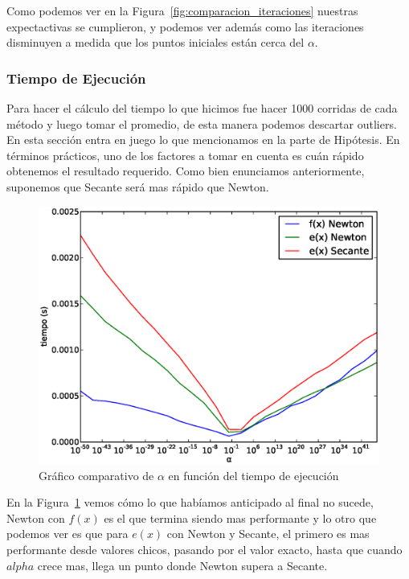Como podemos ver en la Figura~\ref{fig:comparacion_iteraciones} nuestras
expectactivas se cumplieron, y podemos ver además como las iteraciones
disminuyen a medida que los puntos iniciales están cerca del $\alpha$.


\subsubsection{Tiempo de Ejecución} %
\label{ssub:tiempo_de_ejecuci_n}

Para hacer el cálculo del tiempo lo que hicimos fue hacer 1000 corridas de cada
método y luego tomar el promedio, de esta manera podemos descartar outliers. En
esta sección entra en juego lo que mencionamos en la parte de Hipótesis. En
términos prácticos, uno de los factores a tomar en cuenta es cuán rápido
obtenemos el resultado requerido. Como bien enunciamos anteriormente, suponemos
que Secante será mas rápido que Newton.

\begin{figure}[!htbp]
  \begin{center}
    \includegraphics[scale=0.5]{graficos/new/comparacion_tiempos.eps}
    \caption{\label{fig:comparacion_tiempos} Gráfico comparativo de $\alpha$ en función del tiempo de ejecución}
  \end{center}
\end{figure}

En la Figura~\ref{fig:comparacion_tiempos} vemos cómo lo que habíamos
anticipado al final no sucede, Newton con $f(x)$ es el que termina siendo mas
performante y lo otro que podemos ver es que para $e(x)$ con Newton y Secante,
el primero es mas performante desde valores chicos, pasando por el valor
exacto, hasta que cuando $alpha$ crece mas, llega un punto donde Newton supera
a Secante.

